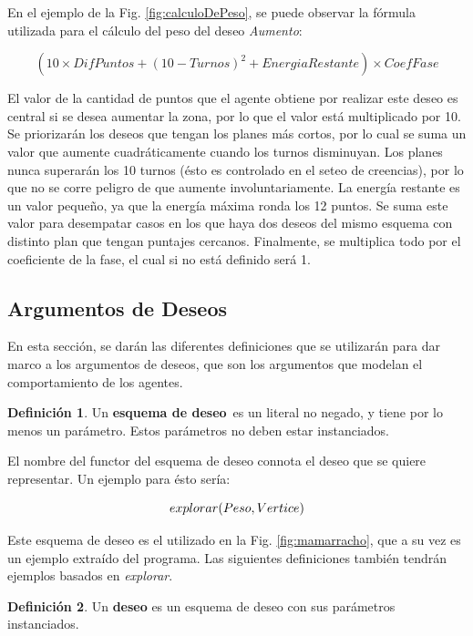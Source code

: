 \documentclass[oneside]{book}
\theoremstyle{definition}
\newtheorem{definicion}{Definición}[section]
\newcommand{\lit}[1]{\mbox{$ #1$}}
\newcommand{\nlA}[1]{$$\mbox{#1}$$}
\begin{document}
En el ejemplo de la Fig. \ref{fig:calculoDePeso}, se puede observar la fórmula 
utilizada para el cálculo del peso del deseo \textit{Aumento}:

$$(10 \times DifPuntos+ (10 - Turnos) ^ 2 + EnergiaRestante) \times CoefFase$$

El valor de la cantidad de puntos que el agente obtiene por realizar este deseo
es central si se desea aumentar la zona, por lo que el valor está multiplicado
por 10. Se priorizarán los deseos que tengan los planes más cortos, por lo cual
se suma un valor que aumente cuadráticamente cuando los turnos disminuyan. Los 
planes nunca superarán los 10 turnos (ésto es controlado en el seteo de 
creencias), por lo que no se corre peligro de que aumente involuntariamente.
La energía restante es un valor pequeño, ya que la energía máxima ronda los 12
puntos. Se suma este valor para desempatar casos en los que haya dos deseos 
del mismo esquema con distinto plan que tengan puntajes cercanos. Finalmente,
se multiplica todo por el coeficiente de la fase, el cual si no está definido 
será 1.


\subsection{Argumentos de Deseos}

\label{sec:argumentosDeseos}

En esta sección, se darán las diferentes definiciones que se utilizarán para dar marco a los
argumentos de deseos, que son los argumentos que modelan el comportamiento de los agentes.

\begin{definicion}
	Un \textbf{esquema de deseo}\ es un literal no negado, y tiene por lo menos 
	un parámetro. Estos parámetros no deben estar instanciados.
\end{definicion}


El nombre del functor del esquema de deseo connota el deseo que se quiere 
representar. Un ejemplo para ésto sería:

\nlA{\lit{explorar(Peso, Vertice)}}

Este esquema de deseo es el utilizado en la Fig. \ref{fig:mamarracho}, que a 
su vez es un ejemplo extraído del programa. Las siguientes definiciones también
tendrán ejemplos basados en \textit{explorar}.

\begin{definicion}
	Un \textbf{deseo} es un esquema de deseo con sus parámetros instanciados.
\end{definicion}
\end{document}
